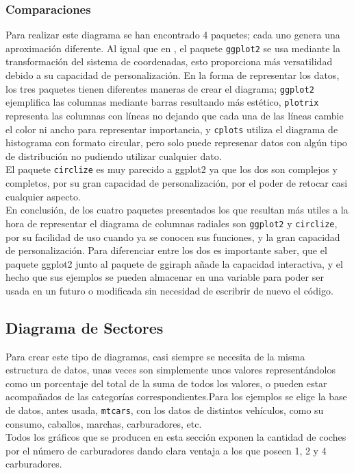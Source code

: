 \documentclass{article}\usepackage[]{graphicx}\usepackage[]{color}
\begin{document}
\subsubsection{Comparaciones}
Para realizar este diagrama se han encontrado 4 paquetes; cada uno genera una aproximaci\'on diferente.
Al igual que en , 
el paquete \texttt{ggplot2} se usa mediante la transformaci\'on del sistema de coordenadas, esto proporciona m\'as versatilidad debido a su capacidad de personalizaci\'on. En la forma de representar los datos, los tres paquetes tienen diferentes maneras de crear el diagrama; \texttt{ggplot2} ejemplifica las columnas mediante barras resultando m\'as est\'etico, \texttt{plotrix} representa las columnas con l\'ineas no dejando que cada una de las l\'ineas cambie el color ni ancho para representar importancia, y \texttt{cplots} utiliza el diagrama de histograma con formato circular, pero solo puede represenar datos con alg\'un tipo de distribuci\'on no pudiendo utilizar cualquier dato. ~\\
El paquete \texttt{circlize} es muy parecido a ggplot2 ya que los dos son complejos y completos, por su gran capacidad de personalizaci\'on, por el poder de retocar casi cualquier aspecto.~\\
En conclusi\'on, de los cuatro paquetes presentados los que resultan m\'as utiles a la hora de representar el diagrama de columnas radiales son \texttt{ggplot2} y \texttt{circlize}, por su facilidad de uso cuando ya se conocen sus funciones, y la gran capacidad de personalizaci\'on. Para diferenciar entre los dos es importante saber, que el paquete ggplot2 junto al paquete de ggiraph a\~nade la capacidad interactiva, y el hecho que sus ejemplos se pueden almacenar en una variable para poder ser usada en un futuro o modificada sin necesidad de escribrir de nuevo el c\'odigo.
\clearpage
\subsection{Diagrama de Sectores}\label{ssec:sectores}
Para crear este tipo de diagramas, casi siempre se necesita de la misma estructura de datos, unas veces son simplemente unos valores represent\'andolos como un porcentaje del total de la suma de todos los valores, o pueden estar acompa\~nados de las categor\'ias correspondientes.Para los ejemplos se elige la base de datos, antes usada, \texttt{mtcars}, con los datos de distintos veh\'iculos, como su consumo, caballos, marchas, carburadores, etc.~\\
Todos los gr\'aficos que se producen en esta secci\'on exponen la cantidad de coches por el n\'umero de carburadores dando clara ventaja a los que poseen 1, 2 y 4 carburadores.
\end{document}
